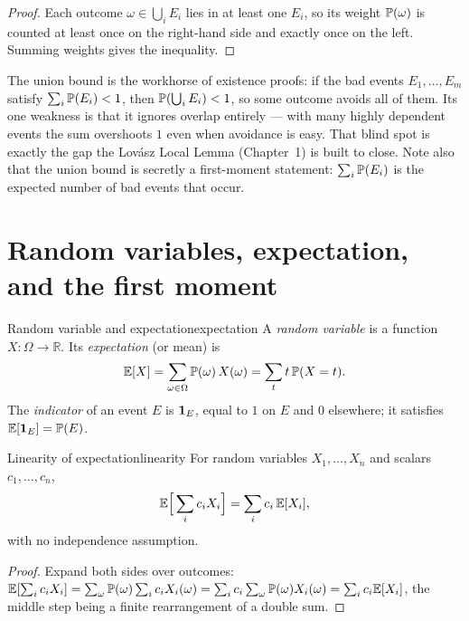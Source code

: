 \begin{proof}
Each outcome $\omega\in\bigcup_i E_i$ lies in at least one $E_i$, so its weight
$\mathbb{P}(\omega)$ is counted at least once on the right-hand side and exactly
once on the left. Summing weights gives the inequality.
\end{proof}

\begin{insight}
The union bound is the workhorse of existence proofs: if the bad events
$E_1,\dots,E_m$ satisfy $\sum_i\mathbb{P}(E_i)<1$, then
$\mathbb{P}(\bigcup_i E_i)<1$, so some outcome avoids all of them. Its one weakness
is that it ignores overlap entirely --- with many highly dependent events the
sum overshoots $1$ even when avoidance is easy. That blind spot is exactly the
gap the Lov\'asz Local Lemma (Chapter~1) is built to close. Note also that the
union bound is secretly a first-moment statement: $\sum_i\mathbb{P}(E_i)$ is the
expected number of bad events that occur.
\end{insight}

\section{Random variables, expectation, and the first moment}

\begin{definition}{Random variable and expectation}{expectation}
A \emph{random variable} is a function $X\colon\Omega\to\mathbb{R}$. Its
\emph{expectation} (or mean) is
\[
  \mathbb{E}[X]=\sum_{\omega\in\Omega}\mathbb{P}(\omega)\,X(\omega)
       =\sum_{t}t\,\mathbb{P}(X=t).
\]
The \emph{indicator} of an event $E$ is $\mathbf{1}_E$, equal to $1$ on $E$ and $0$
elsewhere; it satisfies $\mathbb{E}[\mathbf{1}_E]=\mathbb{P}(E)$.
\end{definition}

\begin{theorem}{Linearity of expectation}{linearity}
For random variables $X_1,\dots,X_n$ and scalars $c_1,\dots,c_n$,
\[
  \mathbb{E}\Bigl[\,\sum_i c_i X_i\Bigr]=\sum_i c_i\,\mathbb{E}[X_i],
\]
with no independence assumption.
\end{theorem}

\begin{proof}
Expand both sides over outcomes:
$\mathbb{E}[\sum_i c_iX_i]=\sum_\omega\mathbb{P}(\omega)\sum_i c_iX_i(\omega)
=\sum_i c_i\sum_\omega\mathbb{P}(\omega)X_i(\omega)=\sum_i c_i\mathbb{E}[X_i]$,
the middle step being a finite rearrangement of a double sum.
\end{proof}

